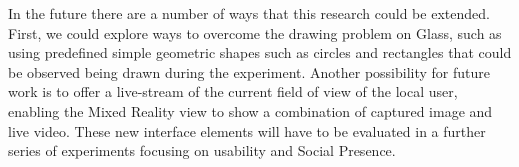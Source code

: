 In the future there are a number of ways that this research could be extended. First, we could explore ways to overcome the drawing problem on Glass, such as using predefined simple geometric shapes such as circles and rectangles that could be observed being drawn during the experiment. Another possibility for future work is to offer a live-stream of the current field of view of the local user, enabling the Mixed Reality view to show a combination of captured image and live video. These new interface elements will have to be evaluated in a further series of experiments focusing on usability and Social Presence.

